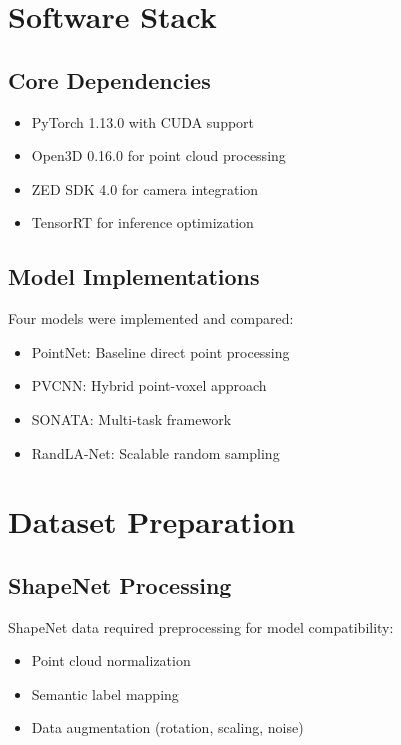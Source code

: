 \documentclass[12pt,a4paper]{report}
\begin{document}
\section{Software Stack}

\subsection{Core Dependencies}

\begin{itemize}
    \item PyTorch 1.13.0 with CUDA support
    \item Open3D 0.16.0 for point cloud processing
    \item ZED SDK 4.0 for camera integration
    \item TensorRT for inference optimization
\end{itemize}

\subsection{Model Implementations}

Four models were implemented and compared:
\begin{itemize}
    \item PointNet: Baseline direct point processing
    \item PVCNN: Hybrid point-voxel approach
    \item SONATA: Multi-task framework
    \item RandLA-Net: Scalable random sampling
\end{itemize}

\section{Dataset Preparation}

\subsection{ShapeNet Processing}

ShapeNet data required preprocessing for model compatibility:
\begin{itemize}
    \item Point cloud normalization
    \item Semantic label mapping
    \item Data augmentation (rotation, scaling, noise)
\end{itemize}
\end{document}
